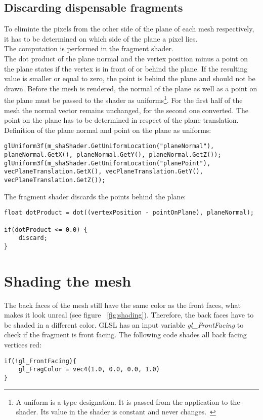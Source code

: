 \subsection{Discarding dispensable fragments}
To eliminte the pixels from the other side of the plane of each mesh respectively, it has to be determined on which side of the plane a pixel lies.\\
The computation is performed in the fragment shader.\\
The dot product of the plane normal and the vertex position minus a point on the plane states if the vertex is in front of or behind the plane. If the resulting value is smaller or equal to zero, the point is behind the plane and should not be drawn. Before the mesh is rendered, the normal of the plane as well as a point on the plane must be passed to the shader as uniforms\footnote{A uniform is a type designation. It is passed from the application to the shader. Its value in the shader is constant and never changes.~\cite{misc:glslTut}}. 
For the first half of the mesh the normal vector remains unchanged, for the second one converted. The point on the plane has to be determined in respect of the plane translation.\\
\newline
Definition of the plane normal and point on the plane as uniforms:
\begin{lstlisting}
glUniform3f(m_shaShader.GetUniformLocation("planeNormal"), planeNormal.GetX(), planeNormal.GetY(), planeNormal.GetZ());
glUniform3f(m_shaShader.GetUniformLocation("planePoint"), vecPlaneTranslation.GetX(), vecPlaneTranslation.GetY(), vecPlaneTranslation.GetZ());
\end{lstlisting}

The fragment shader discards the points behind the plane:
\begin{lstlisting}
float dotProduct = dot((vertexPosition - pointOnPlane), planeNormal);
		
if(dotProduct <= 0.0) {
	discard;
}
\end{lstlisting}

\section{Shading the mesh}
The back faces of the mesh still have the same color as the front faces, what makes it look unreal (see figure ~\ref{fig:shading}). Therefore, the back faces have to be shaded in a different color. GLSL has an input variable \emph{gl_FrontFacing} to check if the fragment is front facing. The following code shades all back facing vertices red:
\begin{lstlisting}
if(!gl_FrontFacing){
	gl_FragColor = vec4(1.0, 0.0, 0.0, 1.0)
}
\end{lstlisting}

